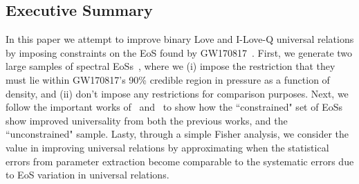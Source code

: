 \documentclass[prd,twocolumn,nofootinbib,superscriptaddress,amsmath,amssymb]{revtex4-1}
\begin{document}
\subsection{Executive Summary}
In this paper we attempt to improve binary Love and I-Love-Q universal relations by imposing constraints on the EoS found by GW170817~\cite{LIGO:posterior,TheLIGOScientific:2017qsa}.
First, we generate two large samples of spectral EoSs~\cite{Lindblom:2018rfr}, where we (i) impose the restriction that they must lie within GW170817's 90\% credible region in pressure as a function of density, and (ii) don't impose any restrictions for comparison purposes.
Next, we follow the important works of~\cite{Yagi:binLove} and~\cite{Yagi:ILQ} to show how the ``constrained" set of EoSs show improved universality from both the previous works, and the ``unconstrained" sample.
Lasty, through a simple Fisher analysis, we consider the value in improving universal relations by approximating when the statistical errors from parameter extraction become comparable to the systematic errors due to EoS variation in universal relations.
\end{document}
